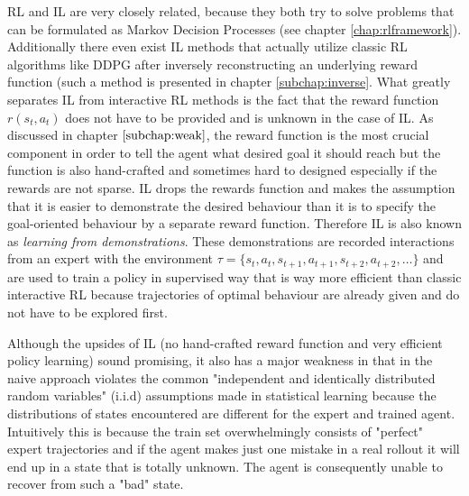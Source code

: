 \par
RL and IL are very closely related, because they both try to solve problems that can be formulated as Markov Decision Processes (see chapter \ref{chap:rlframework}). Additionally there even exist IL methods that actually utilize classic RL algorithms like DDPG after inversely reconstructing an underlying reward function (such a method is presented in chapter \ref{subchap:inverse}. What greatly separates IL from interactive RL methods is the fact that the reward function $r(s_t, a_t)$ does not have to be provided and is unknown in the case of IL. As discussed in chapter $\ref{subchap:weak}$, the reward function is the most crucial component in order to tell the agent what desired goal it should reach but the function is also hand-crafted and sometimes hard to designed especially if the rewards are not sparse. IL drops the rewards function and makes the assumption that it is easier to demonstrate the desired behaviour than it is to specify the goal-oriented behaviour by a separate reward function. Therefore IL is also known as \textit{learning from demonstrations}. These demonstrations are recorded interactions from an expert with the environment $\tau = \{s_t, a_t, s_{t+1}, a_{t+1}, s_{t+2}, a_{t+2}, \dots\}$ and are used to train a policy in supervised way that is way more efficient than classic interactive RL because trajectories of optimal behaviour are already given and do not have to be explored first.
\par
Although the upsides of IL (no hand-crafted reward function and very efficient policy learning) sound promising, it also has a major weakness in that in the naive approach violates the common "independent and identically distributed random variables" (i.i.d) assumptions made in statistical learning \cite{ross2011reduction} because the distributions of states encountered are different for the expert and trained agent. Intuitively this is because the train set overwhelmingly consists of "perfect" expert trajectories and if the agent makes just one mistake in a real rollout it will end up in a state that is totally unknown. The agent is consequently unable to recover from such a "bad" state.


